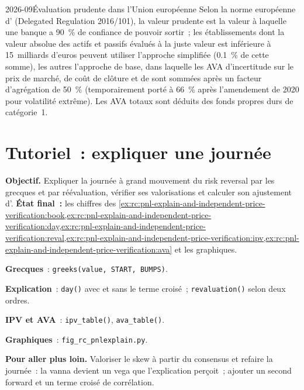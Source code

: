\begin{dated}{2026-09}{Évaluation prudente dans l'Union européenne}\label{dat:rc:pnl-explain-and-independent-price-verification:pv}
Selon la norme européenne d' (Delegated Regulation 2016/101), la valeur prudente est la valeur
à laquelle une banque a 90~\% de confiance de pouvoir sortir~; les établissements dont la valeur absolue des actifs et passifs évalués à la juste valeur est inférieure à 15~milliards d'euros
peuvent utiliser l'approche simplifiée (0.1~\% de cette somme), les autres l'approche de base, dans laquelle
les AVA d'incertitude sur le prix de marché, de coût de clôture et de  sont sommées après un facteur d'agrégation
de 50~\% (temporairement porté à 66~\% après l'amendement de 2020 pour volatilité extrême). Les AVA totaux sont déduits des
fonds propres durs de catégorie~1.
\end{dated}

\section{Tutoriel~: expliquer une journée}\label{tut:rc:pnl-explain-and-independent-price-verification:tutorial}

\begin{tutorial}
\textbf{Objectif.} Expliquer la journée à grand mouvement du risk reversal par les grecques et par réévaluation, vérifier ses valorisations et
calculer son ajustement d'. \textbf{État final~:} les chiffres des
\cref{ex:rc:pnl-explain-and-independent-price-verification:book,ex:rc:pnl-explain-and-independent-price-verification:day,ex:rc:pnl-explain-and-independent-price-verification:reval,ex:rc:pnl-explain-and-independent-price-verification:ipv,ex:rc:pnl-explain-and-independent-price-verification:ava}
et les graphiques.
\begin{tutsteps}
\item \textbf{Grecques}~: \texttt{greeks(value, START, BUMPS)}.
\item \textbf{Explication}~: \texttt{day()} avec et sans le terme croisé~; \texttt{revaluation()} selon deux ordres.
\item \textbf{IPV et AVA}~: \texttt{ipv\_table()}, \texttt{ava\_table()}.
\item \textbf{Graphiques}~: \texttt{fig\_rc\_pnlexplain.py}.
\end{tutsteps}
\textbf{Pour aller plus loin.} Valoriser le skew à partir du consensus et refaire la journée~: la vanna devient un vega
que l'explication perçoit~; ajouter un second forward et un terme croisé de corrélation.
\end{tutorial}

